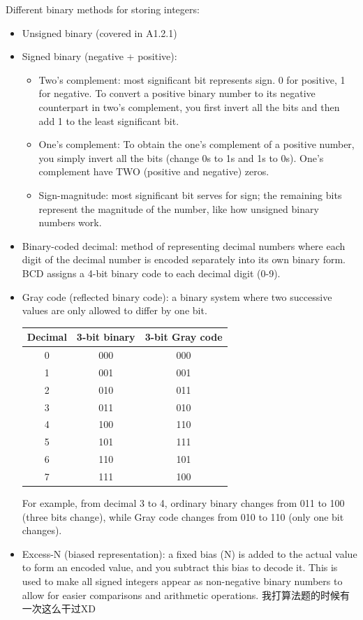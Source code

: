 Different binary methods for storing integers:
\begin{itemize}
    \item Unsigned binary (covered in A1.2.1)
    \item Signed binary (negative + positive):
    \begin{itemize}
        \item Two's complement: most significant bit represents sign. 0 for positive, 1 for negative. To convert a positive binary number to its negative counterpart in two’s complement, you first invert all the bits and then add 1 to the least significant bit.
        \item One’s complement: To obtain the one’s complement of a positive number, you simply invert all the bits (change 0s to 1s and 1s to 0s). One's complement have TWO (positive and negative) zeros.
        \item Sign-magnitude: most significant bit serves for sign; the remaining bits represent the magnitude of the number, like how unsigned binary numbers work. 
        \end{itemize}
\item Binary-coded decimal: method of representing decimal numbers where each digit of the decimal number is encoded separately into its own binary form. BCD assigns a 4-bit binary code to each decimal digit (0-9). 
\item Gray code (reflected binary code): a binary system where two successive values are only allowed to differ by one bit.
\begin{center}
\begin{tabular}{|c|c|c|}
\hline
\textbf{Decimal} & \textbf{3-bit binary} & \textbf{3-bit Gray code} \\
\hline
0 & 000 & 000 \\
1 & 001 & 001 \\
2 & 010 & 011 \\
3 & 011 & 010 \\
4 & 100 & 110 \\
5 & 101 & 111 \\
6 & 110 & 101 \\
7 & 111 & 100 \\
\hline
\end{tabular}
\end{center}
For example, from decimal 3 to 4, ordinary binary changes from 011 to 100 (three bits change), while Gray code changes from 010 to 110 (only one bit changes).
\item Excess-N (biased representation): a fixed bias (N) is added to the actual value to form an encoded value, and you subtract this bias to decode it. This is used to make all signed integers appear as non-negative binary numbers to allow for easier comparisons and arithmetic operations. 我打算法题的时候有一次这么干过XD

\end{itemize}

